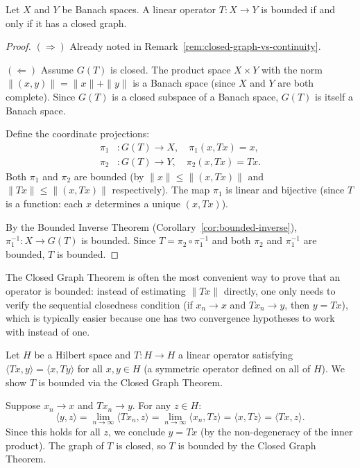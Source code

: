 \documentclass[11pt,a4paper]{article}
\begin{document}
\begin{theorem}
\label{thm:closed-graph}
Let $X$ and $Y$ be Banach spaces. A linear operator $T \colon X \to Y$
is bounded if and only if it has a closed graph.
\end{theorem}

\begin{proof}
$(\Rightarrow)$ Already noted in Remark~\ref{rem:closed-graph-vs-continuity}.

$(\Leftarrow)$ Assume $G(T)$ is closed. The product space $X \times Y$
with the norm $\|(x,y)\| = \|x\| + \|y\|$ is a Banach space (since $X$
and $Y$ are both complete). Since $G(T)$ is a closed subspace of a
Banach space, $G(T)$ is itself a Banach space.

Define the coordinate projections:
\begin{align*}
    \pi_1 &\colon G(T) \to X, \quad \pi_1(x, Tx) = x, \\
    \pi_2 &\colon G(T) \to Y, \quad \pi_2(x, Tx) = Tx.
\end{align*}
Both $\pi_1$ and $\pi_2$ are bounded (by $\|x\| \leq \|(x, Tx)\|$ and
$\|Tx\| \leq \|(x, Tx)\|$ respectively). The map $\pi_1$ is linear and
bijective (since $T$ is a function: each $x$ determines a unique
$(x, Tx)$).

By the Bounded Inverse Theorem (Corollary~\ref{cor:bounded-inverse}),
$\pi_1^{-1} \colon X \to G(T)$ is bounded. Since $T = \pi_2 \circ \pi_1^{-1}$
and both $\pi_2$ and $\pi_1^{-1}$ are bounded, $T$ is bounded.
\end{proof}

\begin{remark}
\label{rem:closed-graph-usage}
The Closed Graph Theorem is often the most convenient way to prove that
an operator is bounded: instead of estimating $\|Tx\|$ directly, one
only needs to verify the sequential closedness condition (if $x_n \to x$
and $Tx_n \to y$, then $y = Tx$), which is typically easier because one
has two convergence hypotheses to work with instead of one.
\end{remark}

\begin{example}
\label{ex:symmetric-bounded}
Let $H$ be a Hilbert space and $T \colon H \to H$ a linear operator
satisfying $\langle Tx, y \rangle = \langle x, Ty \rangle$ for all
$x, y \in H$ (a symmetric operator defined on all of $H$). We show $T$
is bounded via the Closed Graph Theorem.

Suppose $x_n \to x$ and $Tx_n \to y$. For any $z \in H$:
\[
    \langle y, z \rangle = \lim_{n \to \infty} \langle Tx_n, z \rangle
    = \lim_{n \to \infty} \langle x_n, Tz \rangle
    = \langle x, Tz \rangle = \langle Tx, z \rangle.
\]
Since this holds for all $z$, we conclude $y = Tx$ (by the
non-degeneracy of the inner product). The graph of $T$ is closed, so
$T$ is bounded by the Closed Graph Theorem.
\end{example}
\end{document}
